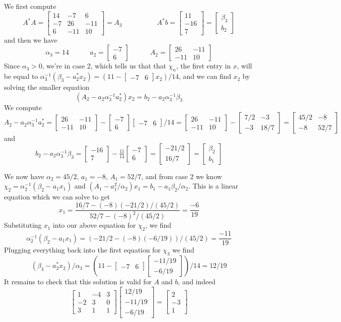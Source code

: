 \documentclass[12pt]{article}
\newcommand{\bmat}[1]{\begin{bmatrix}#1\end{bmatrix}}
\begin{document}
We first compute
$$A^*A = \bmat{14 & -7 & 6\\ -7 & 26 & -11\\6 & -11 & 10} = A_3 \hspace{5em} A^*b =
\bmat{11\\ -16\\ 7} = \bmat{\beta_3\\b_2}$$
and then we have
$$\alpha_3 = 14 \hspace{3em} a_2 = \bmat{-7\\6} \hspace{3em} A_2 = \bmat{26 &
  -11\\-11 & 10}$$
Since $\alpha_3 > 0$, we're in case 2, which tells us that that $\chi_n$, the
first entry in $x$, will be equal to $\alpha_3^{-1}(\beta_3 - a^*_2x_2) = (11 -
\bmat{-7 & 6}x_2)/14$, and we can find $x_2$ by solving the smaller equation
$$ (A_2 - a_2\alpha_3^{-1}a_2^*)x_2 = b_2 - a_2\alpha_3^{-1}\beta_3$$
We compute
$$ A_2 - a_2\alpha_3^{-1} a_2^* = \bmat{26 & -11\\-11 & 10} - \bmat{-7 \\
  6}\bmat{-7&6}/14 = \bmat{26 & -11\\-11 & 10} - \bmat{7/2 & -3\\-3 & 18/7} =
\bmat{45/2 & -8\\-8 & 52/7}$$
and
$$ b_2 - a_2\alpha_3^{-1}\beta_3 = \bmat{-16\\7} - \tfrac{11}{14}\bmat{-7\\6} =
\bmat{-21/2\\ 16/7} = \bmat{\beta_2\\b_1} $$

We now have $\alpha_2 = 45/2$, $a_1 = -8$, $A_1 = 52/7$, and from case 2
we know $\chi_2 = \alpha_2^{-1}(\beta_2 - a_1x_1)$ and $(A_1 - a_1^2/\alpha_2)x_1
= b_1 - a_1\beta_2/\alpha_2$. This is a linear equation which we can solve to
get
$$ x_1 = \frac{16/7 - (-8)(-21/2)/(45/2)}{52/7 - (-8)^2/(45/2)} =
\frac{-6}{19} $$
Substituting $x_1$ into our above equation for $\chi_2$, we find
$$ \alpha_2^{-1}(\beta_2 - a_1x_1) = (-21/2 - (-8)(-6/19))/(45/2) = \frac{-11}{19} $$
Plugging everything back into the first equation for $\chi_3$ we find
$$(\beta_3 - a_2^*x_2)/\alpha_3 = (11 - \bmat{-7 & 6}\bmat{-11/19\\-6/19})/14
= 12/19$$
It remains to check that this solution is valid for $A$ and $b$, and indeed
$$ \bmat{1 & -4 & 3\\-2 & 3 & 0\\3 & 1 & 1}\bmat{12/19\\-11/19\\-6/19} =
\bmat{2\\ -3 \\ 1}  $$
\end{document}
